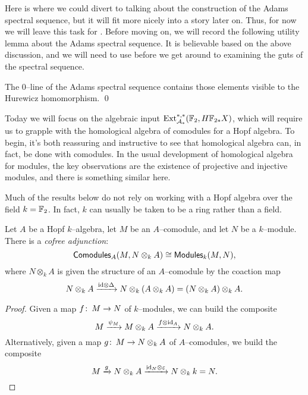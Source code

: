 Here is where we could divert to talking about the construction of the Adams spectral sequence, but it will fit more nicely into a story later on.  Thus, for now we will leave this task for .  Before moving on, we will record the following utility lemma about the Adams spectral sequence.  It is believable based on the above discussion, and we will need to use before we get around to examining the guts of the spectral sequence.
\begin{lemma}\label{HurewiczImageOnZeroLine}
The $0$--line of the Adams spectral sequence contains those elements visible to the Hurewicz homomorphism. \qed {}
\end{lemma}

Today we will focus on the algebraic input $\operatorname{Ext}_{\mathcal A_*}^{*, *}(\mathbb F_2, H\mathbb F_{2*} X)$, which will require us to grapple with the homological algebra of comodules for a Hopf algebra.  To begin, it's both reassuring and instructive to see that homological algebra can, in fact, be done with comodules.  In the usual development of homological algebra for modules, the key observations are the existence of projective and injective modules, and there is something similar here.

\begin{remark}
Much of the results below do not rely on working with a Hopf algebra over the field $k = \mathbb F_2$.  In fact, $k$ can usually be taken to be a ring rather than a field.
\end{remark}

\begin{lemma}
Let $A$ be a Hopf $k$--algebra, let $M$ be an $A$--comodule, and let $N$ be a $k$--module.  There is a \textit{cofree adjunction}: \[\mathsf{Comodules}_A(M, N \otimes_k A) \cong \mathsf{Modules}_k(M, N),\] where $N \otimes_k A$ is given the structure of an $A$--comodule by the coaction map \[N \otimes_k A \xrightarrow{\mathrm{id} \otimes \Delta} N \otimes_k (A \otimes_k A) = (N \otimes_k A) \otimes_k A.\]
\end{lemma}
\begin{proof}
Given a map $f\colon\thinspace M \to N$ of $k$--modules, we can build the composite \[M \xrightarrow{\psi_M} M \otimes_k A \xrightarrow{f \otimes \mathrm{id}_A} N \otimes_k A.\]  Alternatively, given a map $g\colon\thinspace M \to N \otimes_k A$ of $A$--comodules, we build the composite \[M \xrightarrow{g} N \otimes_k A \xrightarrow{\id_N \otimes \eps} N \otimes_k k = N. \qed\]
\end{proof}

